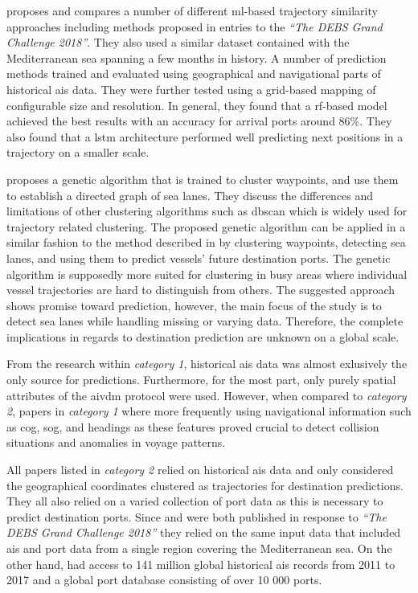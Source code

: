\cite{Karatas2020TrajectoryData} proposes and compares a number of different \acrshort{ml}-based trajectory similarity approaches including methods proposed in entries to the \textit{``The DEBS Grand Challenge 2018''}. They also used a similar dataset contained with the Mediterranean sea spanning a few months in history. A number of prediction methods trained and evaluated using geographical and navigational parts of historical \acrshort{ais} data. They were further tested using a grid-based mapping of configurable size and resolution. In general, they found that a \acrshort{rf}-based model achieved the best results with an accuracy for arrival ports around 86\%. They also found that a \acrfull{lstm} architecture performed well predicting next positions in a trajectory on a smaller scale.

\cite{Dobrkovic2018MaritimeData} proposes a genetic algorithm that is trained to cluster waypoints, and use them to establish a directed graph of sea lanes. They discuss the differences and limitations of other clustering algorithms such as \acrshort{dbscan} which is widely used for trajectory related clustering. The proposed genetic algorithm can be applied in a similar fashion to the method described in \cite{pallotta} by clustering waypoints, detecting sea lanes, and using them to predict vessels' future destination ports. The genetic algorithm is supposedly more suited for clustering in busy areas where individual vessel trajectories are hard to distinguish from others. The suggested approach shows promise toward prediction, however, the main focus of the study is to detect sea lanes while handling missing or varying data. Therefore, the complete implications in regards to destination prediction are unknown on a global scale.


From the research within \textit{category 1}, historical \acrshort{ais} data was almost exlusively the only source for predictions. Furthermore, for the most part, only purely spatial attributes of the \gls{aivdm} protocol were used. However, when compared to \textit{category 2}, papers in \textit{category 1} where more frequently using navigational information such as \acrshort{cog}, \acrshort{sog}, and headings as these features proved crucial to detect collision situations and anomalies in voyage patterns.

All papers listed in \textit{category 2} relied on historical \acrshort{ais} data and only considered the geographical coordinates clustered as trajectories for destination predictions. They all also relied on a varied collection of port data as this is necessary to predict destination ports. Since \cite{Rosca2018GrandRoutes} and \cite{Bachar2018GrandDestination} were both published in response to \textit{``The DEBS Grand Challenge 2018''} they relied on the same input data that included \acrshort{ais} and port data from a single region covering the Mediterranean sea. On the other hand, \cite{Zhang2020AISApproach} had access to 141 million global historical \acrshort{ais} records from 2011 to 2017 and a global port database consisting of over 10 000 ports.


